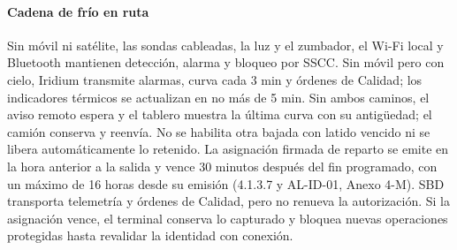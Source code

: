 \paragraph{Cadena de frío en ruta}
Sin móvil ni satélite, las sondas cableadas, la luz y el zumbador, el Wi-Fi local y Bluetooth mantienen detección, alarma y bloqueo por SSCC. Sin móvil pero con cielo, Iridium transmite alarmas, curva cada 3 min y órdenes de Calidad; los indicadores térmicos se actualizan en no más de 5 min. Sin ambos caminos, el aviso remoto espera y el tablero muestra la última curva con su antigüedad; el camión conserva y reenvía. No se habilita otra bajada con latido vencido ni se libera automáticamente lo retenido. La asignación firmada de reparto se emite en la hora anterior a la salida y vence 30 minutos después del fin programado, con un máximo de 16 horas desde su emisión (4.1.3.7 y AL-ID-01, Anexo 4-M). SBD transporta telemetría y órdenes de Calidad, pero no renueva la autorización. Si la asignación vence, el terminal conserva lo capturado y bloquea nuevas operaciones protegidas hasta revalidar la identidad con conexión.
